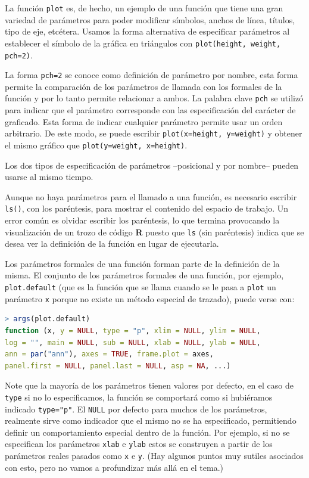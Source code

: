 \documentclass[spanish]{extbook}
\numberwithin{equation}{section}
\numberwithin{figure}{section}
\begin{document}
La función \texttt{plot} es, de hecho, un ejemplo de una función que tiene una
gran variedad de parámetros para poder modificar símbolos, anchos de línea,
títulos, tipo de eje, etcétera. Usamos la forma alternativa de especificar
parámetros al establecer el símbolo de la gráfica en triángulos con
\texttt{plot(height, weight, pch=2)}. 

La forma \texttt{pch=2} se conoce como definición de parámetro por nombre, esta
forma permite la comparación de los parámetros de llamada con los formales de
la función y por lo tanto permite relacionar a ambos. La palabra clave
\texttt{pch} se utilizó para indicar que el parámetro corresponde con las
especificación del carácter de graficado. Esta forma de indicar cualquier
parámetro permite usar un orden arbitrario. De este modo, se puede escribir
\texttt{plot(x=height, y=weight)} y obtener el mismo gráfico que
\texttt{plot(y=weight, x=height)}.  

Los dos tipos de especificación de parámetros --posicional y por nombre-- pueden
usarse al mismo tiempo. 

Aunque no haya parámetros para el llamado a una función, es necesario escribir
\texttt{ls()}, con los paréntesis, para mostrar el contenido del espacio de
trabajo. Un error común es olvidar escribir los paréntesis, lo que termina
provocando la visualización de un trozo de código \textbf{R} puesto que
\texttt{ls} (sin paréntesis) indica que se desea ver la definición de la
función en lugar de ejecutarla.

Los parámetros formales de una función forman parte de la definición de la
misma. El conjunto de los parámetros formales de una función, por ejemplo,
\texttt{plot.default} (que es la función que se llama cuando se le pasa a
\texttt{plot} un parámetro \texttt{x} porque no existe un método especial de
trazado), puede verse con:
\newpage

\begin{lstlisting}[language=R]
> args(plot.default)
function (x, y = NULL, type = "p", xlim = NULL, ylim = NULL,
log = "", main = NULL, sub = NULL, xlab = NULL, ylab = NULL,
ann = par("ann"), axes = TRUE, frame.plot = axes,
panel.first = NULL, panel.last = NULL, asp = NA, ...)
\end{lstlisting}

Note que la mayoría de los parámetros tienen valores por defecto, en el caso de
\texttt{type} si no lo especificamos, la función se comportará como si
hubiéramos indicado \texttt{type="p"}. El \texttt{NULL} por defecto para muchos
de los parámetros, realmente sirve como indicador que el mismo no se ha
especificado, permitiendo definir un comportamiento especial dentro de la
función. Por ejemplo, si no se especifican los parámetros \texttt{xlab} e
\texttt{ylab} estos se construyen a partir de los parámetros reales pasados
como \texttt{x} e \texttt{y}. (Hay algunos puntos muy sutiles asociados con
esto, pero no vamos a profundizar más allá en el tema.)
\end{document}
